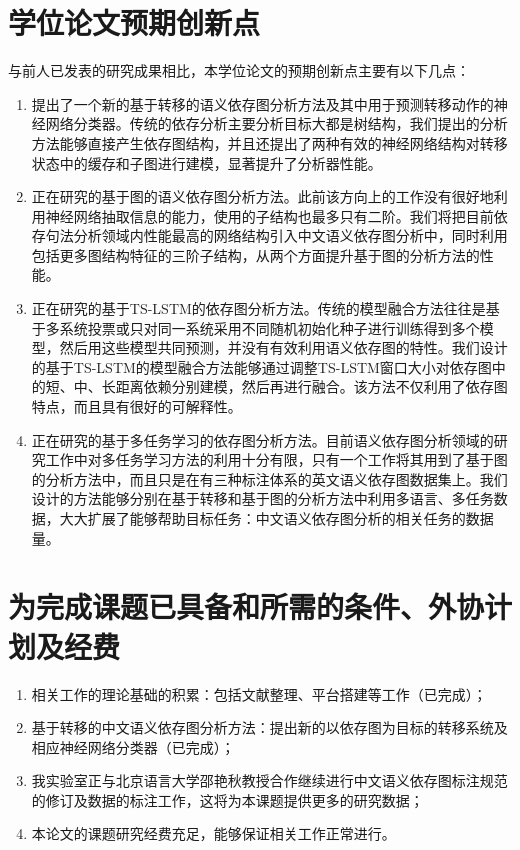 \section{学位论文预期创新点}
与前人已发表的研究成果相比，本学位论文的预期创新点主要有以下几点：
\begin{enumerate}
	\item 提出了一个新的基于转移的语义依存图分析方法及其中用于预测转移动作的神经网络分类器。传统的依存分析主要分析目标大都是树结构，我们提出的分析方法能够直接产生依存图结构，并且还提出了两种有效的神经网络结构对转移状态中的缓存和子图进行建模，显著提升了分析器性能。
	\item 正在研究的基于图的语义依存图分析方法。此前该方向上的工作没有很好地利用神经网络抽取信息的能力，使用的子结构也最多只有二阶。我们将把目前依存句法分析领域内性能最高的网络结构引入中文语义依存图分析中，同时利用包括更多图结构特征的三阶子结构，从两个方面提升基于图的分析方法的性能。
	\item 正在研究的基于TS-LSTM的依存图分析方法。传统的模型融合方法往往是基于多系统投票或只对同一系统采用不同随机初始化种子进行训练得到多个模型，然后用这些模型共同预测，并没有有效利用语义依存图的特性。我们设计的基于TS-LSTM的模型融合方法能够通过调整TS-LSTM窗口大小对依存图中的短、中、长距离依赖分别建模，然后再进行融合。该方法不仅利用了依存图特点，而且具有很好的可解释性。
	\item 正在研究的基于多任务学习的依存图分析方法。目前语义依存图分析领域的研究工作中对多任务学习方法的利用十分有限，只有一个工作将其用到了基于图的分析方法中，而且只是在有三种标注体系的英文语义依存图数据集上。我们设计的方法能够分别在基于转移和基于图的分析方法中利用多语言、多任务数据，大大扩展了能够帮助目标任务：中文语义依存图分析的相关任务的数据量。
\end{enumerate}

\section{为完成课题已具备和所需的条件、外协计划及经费}
\begin{enumerate}
	\item 相关工作的理论基础的积累：包括文献整理、平台搭建等工作（已完成）；
	\item 基于转移的中文语义依存图分析方法：提出新的以依存图为目标的转移系统及相应神经网络分类器（已完成）；
	\item 我实验室正与北京语言大学邵艳秋教授合作继续进行中文语义依存图标注规范的修订及数据的标注工作，这将为本课题提供更多的研究数据；
	\item 本论文的课题研究经费充足，能够保证相关工作正常进行。
\end{enumerate}


